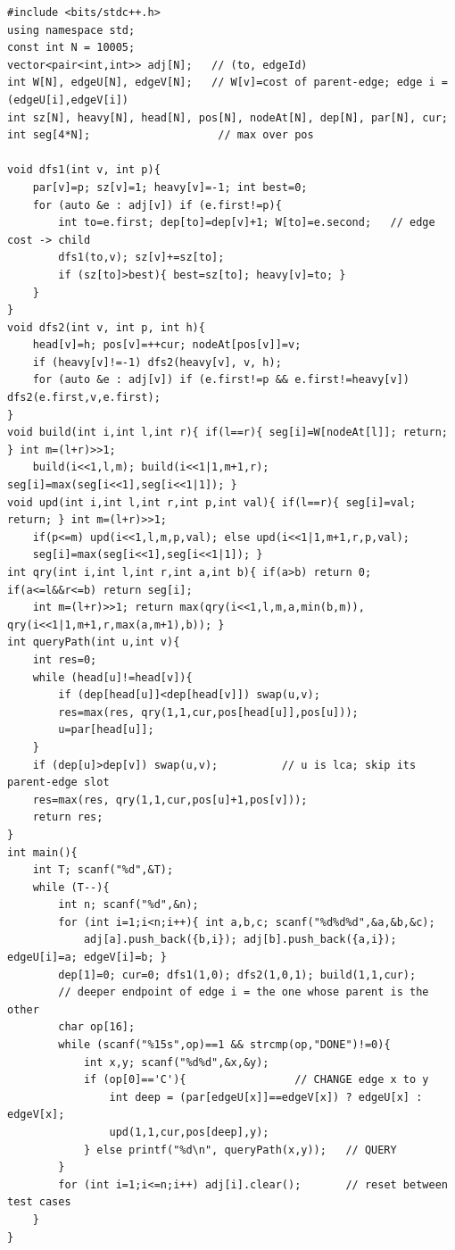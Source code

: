 \begin{lstlisting}[caption={SPOJ QTREE full solution: edges charged to the deeper endpoint, max segment tree over pos, jump loop with the lca slot excluded}, label={lst:c16-qtree}]
#include <bits/stdc++.h>
using namespace std;
const int N = 10005;
vector<pair<int,int>> adj[N];   // (to, edgeId)
int W[N], edgeU[N], edgeV[N];   // W[v]=cost of parent-edge; edge i = (edgeU[i],edgeV[i])
int sz[N], heavy[N], head[N], pos[N], nodeAt[N], dep[N], par[N], cur;
int seg[4*N];                    // max over pos

void dfs1(int v, int p){
    par[v]=p; sz[v]=1; heavy[v]=-1; int best=0;
    for (auto &e : adj[v]) if (e.first!=p){
        int to=e.first; dep[to]=dep[v]+1; W[to]=e.second;   // edge cost -> child
        dfs1(to,v); sz[v]+=sz[to];
        if (sz[to]>best){ best=sz[to]; heavy[v]=to; }
    }
}
void dfs2(int v, int p, int h){
    head[v]=h; pos[v]=++cur; nodeAt[pos[v]]=v;
    if (heavy[v]!=-1) dfs2(heavy[v], v, h);
    for (auto &e : adj[v]) if (e.first!=p && e.first!=heavy[v]) dfs2(e.first,v,e.first);
}
void build(int i,int l,int r){ if(l==r){ seg[i]=W[nodeAt[l]]; return; } int m=(l+r)>>1;
    build(i<<1,l,m); build(i<<1|1,m+1,r); seg[i]=max(seg[i<<1],seg[i<<1|1]); }
void upd(int i,int l,int r,int p,int val){ if(l==r){ seg[i]=val; return; } int m=(l+r)>>1;
    if(p<=m) upd(i<<1,l,m,p,val); else upd(i<<1|1,m+1,r,p,val);
    seg[i]=max(seg[i<<1],seg[i<<1|1]); }
int qry(int i,int l,int r,int a,int b){ if(a>b) return 0; if(a<=l&&r<=b) return seg[i];
    int m=(l+r)>>1; return max(qry(i<<1,l,m,a,min(b,m)), qry(i<<1|1,m+1,r,max(a,m+1),b)); }
int queryPath(int u,int v){
    int res=0;
    while (head[u]!=head[v]){
        if (dep[head[u]]<dep[head[v]]) swap(u,v);
        res=max(res, qry(1,1,cur,pos[head[u]],pos[u]));
        u=par[head[u]];
    }
    if (dep[u]>dep[v]) swap(u,v);          // u is lca; skip its parent-edge slot
    res=max(res, qry(1,1,cur,pos[u]+1,pos[v]));
    return res;
}
int main(){
    int T; scanf("%d",&T);
    while (T--){
        int n; scanf("%d",&n);
        for (int i=1;i<n;i++){ int a,b,c; scanf("%d%d%d",&a,&b,&c);
            adj[a].push_back({b,i}); adj[b].push_back({a,i}); edgeU[i]=a; edgeV[i]=b; }
        dep[1]=0; cur=0; dfs1(1,0); dfs2(1,0,1); build(1,1,cur);
        // deeper endpoint of edge i = the one whose parent is the other
        char op[16];
        while (scanf("%15s",op)==1 && strcmp(op,"DONE")!=0){
            int x,y; scanf("%d%d",&x,&y);
            if (op[0]=='C'){                 // CHANGE edge x to y
                int deep = (par[edgeU[x]]==edgeV[x]) ? edgeU[x] : edgeV[x];
                upd(1,1,cur,pos[deep],y);
            } else printf("%d\n", queryPath(x,y));   // QUERY
        }
        for (int i=1;i<=n;i++) adj[i].clear();       // reset between test cases
    }
}
\end{lstlisting}

